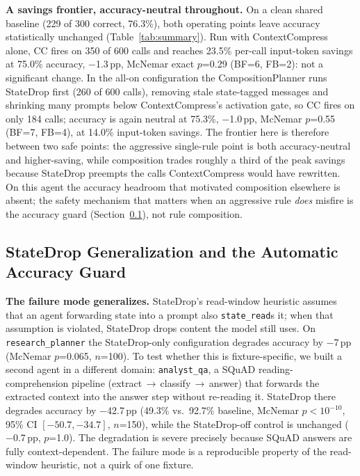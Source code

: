 \documentclass[sigconf,9pt]{acmart}
\begin{document}
\textbf{A savings frontier, accuracy-neutral throughout.} On a clean shared baseline
(229 of 300 correct, 76.3\%), both operating points leave accuracy statistically
unchanged (Table~\ref{tab:summary}). Run with ContextCompress alone, CC fires on 350 of
600 calls and reaches 23.5\% per-call input-token savings at 75.0\% accuracy, $-$1.3\,pp,
McNemar exact $p$=0.29 (BF=6, FB=2): not a significant change. In the all-on
configuration the CompositionPlanner runs StateDrop first (260 of 600 calls), removing
stale state-tagged messages and shrinking many prompts below ContextCompress's activation
gate, so CC fires on only 184 calls; accuracy is again neutral at 75.3\%, $-$1.0\,pp,
McNemar $p$=0.55 (BF=7, FB=4), at 14.0\% input-token savings. The frontier here is
therefore between two safe points: the aggressive single-rule point is both accuracy-neutral
and higher-saving, while composition trades roughly a third of the peak savings because
StateDrop preempts the calls ContextCompress would have rewritten. On this agent the
accuracy headroom that motivated composition elsewhere is absent; the safety mechanism that
matters when an aggressive rule \textit{does} misfire is the accuracy guard
(Section~\ref{sec:eval-guard}), not rule composition.

\subsection{StateDrop Generalization and the Automatic Accuracy Guard}
\label{sec:eval-guard}

\textbf{The failure mode generalizes.} StateDrop's read-window heuristic assumes that an
agent forwarding state into a prompt also \texttt{state\_read}s it; when that assumption
is violated, StateDrop drops content the model still uses. On \texttt{research\_planner}
the StateDrop-only configuration degrades accuracy by $-$7\,pp (McNemar $p$=0.065,
$n$=100). To test whether this is fixture-specific, we built a second agent in a
different domain: \texttt{analyst\_qa}, a SQuAD reading-comprehension pipeline
(extract\,$\rightarrow$\,classify\,$\rightarrow$\,answer) that forwards the extracted
context into the answer step without re-reading it. StateDrop there degrades accuracy by
$-$42.7\,pp (49.3\% vs.\ 92.7\% baseline, McNemar $p<10^{-10}$, 95\% CI $[-50.7,-34.7]$,
$n$=150), while the StateDrop-off control is unchanged ($-$0.7\,pp, $p$=1.0). The
degradation is severe precisely because SQuAD answers are fully context-dependent. The
failure mode is a reproducible property of the read-window heuristic, not a quirk of one
fixture.
\end{document}
